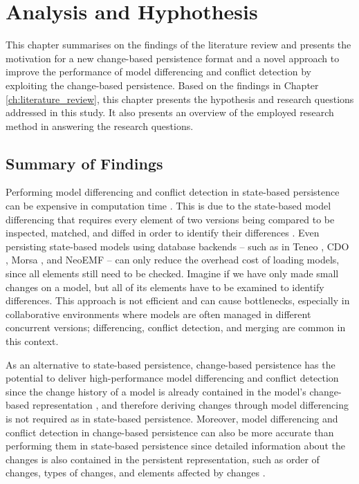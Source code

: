 \chapter{Analysis and Hyphothesis}
\label{ch:analysis_and_hypothesis}

This chapter summarises on the findings of the literature review and presents the motivation for a new change-based persistence format and a novel approach to improve the performance of model differencing and conflict detection by exploiting the change-based persistence. Based on the findings in Chapter \ref{ch:literature_review}, this chapter presents the hypothesis and research questions addressed in this study. It also presents an overview of the employed research method in answering the research questions. 

\section{Summary of Findings}
\label{sec:a_new_change_based_persistence}

Performing model differencing and conflict detection in state-based persistence can be expensive in computation time \cite{DBLP:conf/edoc/KoegelHLHD10}. This is due to the state-based model differencing that requires every element of two versions being compared to be inspected, matched, and diffed in order to identify their differences \cite{emfcompare2018developer}. Even persisting state-based models using database backends -- such as in Teneo \cite{eclipse2017teneo}, CDO \cite{eclipse2019cdo}, Morsa \cite{DBLP:conf/models/Espinazo-PaganCM11}, and NeoEMF \cite{daniel2016neoemf} -- can only reduce the overhead cost of loading models, since all elements still need to be checked. Imagine if we have only made small changes on a model, but all of its elements have to be examined to identify differences. This approach is not efficient and can cause bottlenecks, especially in collaborative environments where models are often managed in different concurrent versions; differencing, conflict detection, and merging are common in this context.

As an alternative to state-based persistence, change-based persistence has the potential to deliver high-performance model differencing and conflict detection since the change history of a model is already contained in the model's change-based representation  \cite{DBLP:conf/sde/LippeO92,DBLP:conf/caise/IgnatN05,koegel2010emfstore}, and therefore deriving changes through model differencing is not required as in state-based persistence. Moreover, model differencing and conflict detection in change-based persistence can also be more accurate than performing them in state-based persistence since detailed information about the changes is also contained in the persistent representation, such as order of changes, types of changes, and elements affected by changes  \cite{DBLP:journals/entcs/RobbesL07,DBLP:conf/sde/LippeO92,DBLP:conf/caise/IgnatN05,mens2002state}.  

